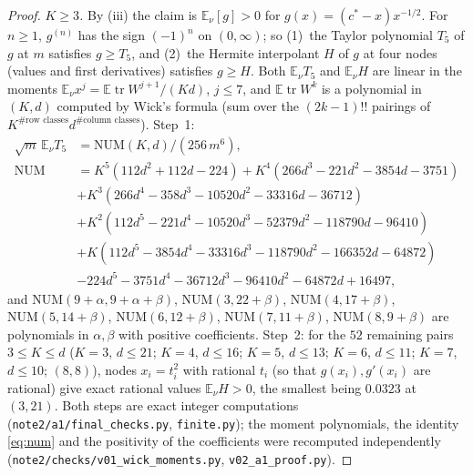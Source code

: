 \documentclass[10pt]{article}
\theoremstyle{definition}
\theoremstyle{remark}
\newcommand{\E}{\mathbb{E}}
\newcommand{\tr}{\operatorname{tr}}
\begin{document}
\begin{proof}
\emph{$K\ge3$.} By (iii) the claim is $\E_\nu[g]>0$ for $g(x)=(c^\ast-x)x^{-1/2}$. For $n\ge1$, $g^{(n)}$ has the sign
$(-1)^n$ on $(0,\infty)$; so (1)~the Taylor polynomial $T_5$ of $g$ at $m$ satisfies $g\ge T_5$, and (2)~the Hermite
interpolant $H$ of $g$ at four nodes (values and first derivatives) satisfies $g\ge H$. Both $\E_\nu T_5$ and $\E_\nu H$
are linear in the moments $\E_\nu x^j=\E\tr W^{j+1}/(Kd)$, $j\le7$, and $\E\tr W^k$ is a polynomial in $(K,d)$ computed by
Wick's formula (sum over the $(2k-1)!!$ pairings of $K^{\#\text{row classes}}d^{\#\text{column classes}}$). Step~1:
\begin{equation}\label{eq:num}
\begin{aligned}
\sqrt m\,\E_\nu T_5&=\mathrm{NUM}(K,d)/(256\,m^6),\\
\mathrm{NUM}&=K^5(112d^2+112d-224)+K^4(266d^3-221d^2-3854d-3751)\\
&+K^3(266d^4-358d^3-10520d^2-33316d-36712)\\
&+K^2(112d^5-221d^4-10520d^3-52379d^2-118790d-96410)\\
&+K(112d^5-3854d^4-33316d^3-118790d^2-166352d-64872)\\
&-224d^5-3751d^4-36712d^3-96410d^2-64872d+16497,
\end{aligned}
\end{equation}
and $\mathrm{NUM}(9+\alpha,9+\alpha+\beta)$, $\mathrm{NUM}(3,22+\beta)$, $\mathrm{NUM}(4,17+\beta)$, $\mathrm{NUM}(5,14+\beta)$,
$\mathrm{NUM}(6,12+\beta)$, $\mathrm{NUM}(7,11+\beta)$, $\mathrm{NUM}(8,9+\beta)$ are polynomials in $\alpha,\beta$ with
positive coefficients. Step~2: for the $52$ remaining pairs $3\le K\le d$ ($K=3$, $d\le21$; $K=4$, $d\le16$; $K=5$,
$d\le13$; $K=6$, $d\le11$; $K=7$, $d\le10$; $(8,8)$), nodes $x_i=t_i^2$ with rational $t_i$ (so that $g(x_i),g'(x_i)$
are rational) give exact rational values $\E_\nu H>0$, the smallest being $0.0323$ at $(3,21)$. Both steps are exact
integer computations (\texttt{note2/a1/final\_checks.py}, \texttt{finite.py}); the moment polynomials, the identity
\eqref{eq:num} and the positivity of the coefficients were recomputed independently
(\texttt{note2/checks/v01\_wick\_moments.py}, \texttt{v02\_a1\_proof.py}).
\end{proof}
\end{document}
